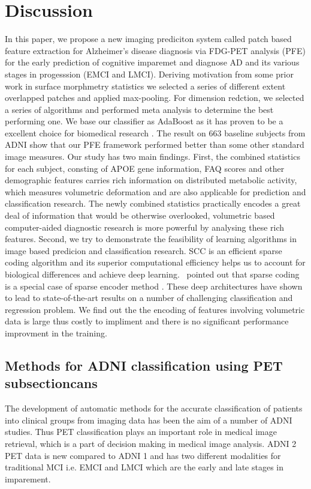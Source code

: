 \documentclass[authoryear,preprint,revi	ew,12pt]{elsarticle}
\begin{document}
\section{Discussion}
In this paper, we propose a new imaging prediciton system called patch based feature extraction for Alzheimer's disease diagnosis via FDG-PET analysis (PFE) for the early prediction of cognitive imparemet and diagnose AD and its various stages in progesssion (EMCI and LMCI). Deriving motivation from some prior work in surface morphmetry statistics  \citep{zhang2016applyiong,zhang2016hyperbolic}  we selected a series of different extent overlapped patches and applied max-pooling. For dimension redction, we selected a series of algorithms and performed meta analysis to determine the best performing one. We base our classifier as AdaBoost as it has proven to be a excellent choice for biomedical research  \citep{?.?}. The result on 663 baseline subjects from ADNI show that our PFE framework performed better than some other standard image measures. Our study has two main findings. First, the combined statistics for each subject, consting of APOE gene information, FAQ scores and other demographic features carries rich information on distributed metabolic activity, which measures volumetric deformation and are also applicable for prediction and classification research. The newly combined statistics practically encodes a great deal of information that would be otherwise overlooked, volumetric based computer-aided diagnostic research is more powerful by analysing these rich features. Second, we try to demonstrate the feasibility of learning algorithms in image based predicion and classification research. SCC is an efficient sparse coding algorithm and its superior computational efficiency helps us to account for biological differences and achieve deep learning.~\cite{gregor2010learning} pointed out that sparse coding is a special case of sparse encoder method  \citep{vincent2010stacked,baldi2012autoencoders}. These deep architectures have shown to lead to state-of-the-art results on a number of challenging classification and regression problem. We find out the the encoding of features involving volumetric data is large thus costly to impliment and there is no significant performance improvment in the training.  

\subsection{Methods for ADNI classification using PET subsectioncans}
The development of automatic methods for the accurate classification of patients into clinical groups from imaging data has been the aim of a number of ADNI studies. Thus PET classification plays an important role in medical image retrieval, which is a part of decision making in medical image analysis. ADNI 2 PET data is new compared to ADNI 1 and has two different modalities for traditional MCI i.e. EMCI and LMCI which are the early and late stages in imparement.
\end{document}
